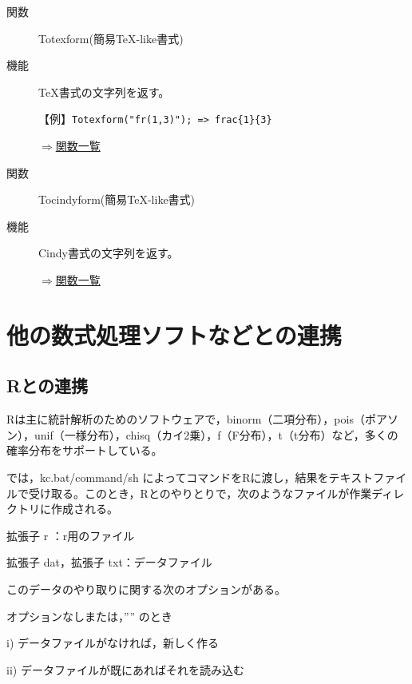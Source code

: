 \documentclass[papersize,a4paper,10pt,uplatex]{jsarticle}
\begin{document}
\begin{description}
\vspace{\baselineskip}
\hypertarget{totexform}{}
\item[関数]Totexform(簡易TeX-like書式)
\item[機能]TeX書式の文字列を返す。

\vspace{\baselineskip}
【例】\verb|Totexform("fr(1,3)"); => frac{1}{3}|

\begin{flushright}\hyperlink{functionlist}{$\Rightarrow$関数一覧}\end{flushright}

\vspace{\baselineskip}
\hypertarget{tocindyform}{}
\item[関数]Tocindyform(簡易TeX-like書式)
\item[機能]Cindy書式の文字列を返す。

\begin{flushright}\hyperlink{functionlist}{$\Rightarrow$関数一覧}\end{flushright}

\end{description}
\newpage

\section{他の数式処理ソフトなどとの連携}
\subsection{Rとの連携}

Rは主に統計解析のためのソフトウェアで，binorm（二項分布），pois（ポアソン），unif（一様分布），chisq（カイ2乗），f（F分布），t（t分布）など，多くの確率分布をサポートしている。

\ketcindy では，kc.bat/command/sh によってコマンドをRに渡し，結果をテキストファイルで受け取る。このとき，Rとのやりとりで，次のようなファイルが作業ディレクトリに作成される。

拡張子 r ：r用のファイル

拡張子 dat，拡張子 txt：データファイル

このデータのやり取りに関する次のオプションがある。

オプションなしまたは，”” のとき

i) データファイルがなければ，新しく作る

ii) データファイルが既にあればそれを読み込む
\end{document}
